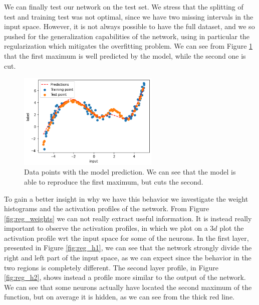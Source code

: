 We can finally test our network on the test set. We stress that the splitting of test and training test was not optimal, 
since we have two missing intervals in the input space. However, it is not always possible to have the full dataset, and
we so pushed for the generalization capabilities of the network, using in particular the regularization which mitigates the 
overfitting problem. 
We can see from Figure \ref{fig:reg_pred} that the first maximum is well predicted by the model, while the second one is cut.
\begin{figure}[h]
    \centering
    \includegraphics[width=0.6\textwidth]{Images/regression_pred.png}
    \caption{Data points with the model prediction. We can see that the model is able to reproduce the first maximum, but cuts the 
        second.}
    \label{fig:reg_pred}
\end{figure}
To gain a better insight in why we have this behavior we investigate the weight histograms and the activation profiles
of the network.
From Figure \ref{fig:reg_weights} we can not really extract useful information.
It is instead really important to observe the activation profiles, in which we plot on a $3d$ plot the activation profile
wrt the input space for some of the neurons. In the first layer, presented in Figure \ref{fig:reg_h1}, we can see that the network strongly divide the right and left
part of the input space, as we can expect since the behavior in the two regions is completely different. The second layer 
profile, in Figure \ref{fig:reg_h2}, shows instead a profile more similar to the output of the network. We can see that some neurons actually have located the second maximum of the 
function, but on average it is hidden, as we can see from the thick red line.

